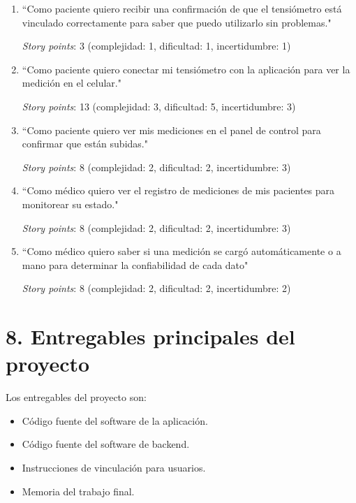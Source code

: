 \documentclass[
11pt, %
]{charter}
\begin{document}
\begin{enumerate}

\item ``Como paciente quiero recibir una confirmación de que el tensiómetro está vinculado correctamente para saber que puedo utilizarlo sin problemas."

\textit{Story points}: 3 (complejidad: 1, dificultad: 1, incertidumbre: 1)

\item ``Como paciente quiero conectar mi tensiómetro con la aplicación para ver la medición en el celular."

\textit{Story points}: 13 (complejidad: 3, dificultad: 5, incertidumbre: 3)

\item ``Como paciente quiero ver mis mediciones en el panel de control para confirmar que están subidas."

\textit{Story points}: 8 (complejidad: 2, dificultad: 2, incertidumbre: 3)

\item ``Como médico quiero ver el registro de mediciones de mis pacientes para monitorear su estado."

\textit{Story points}: 8 (complejidad: 2, dificultad: 2, incertidumbre: 3)

\item ``Como médico quiero saber si una medición se cargó automáticamente o a mano para determinar la confiabilidad de cada dato"

\textit{Story points}: 8 (complejidad: 2, dificultad: 2, incertidumbre: 2)

\end{enumerate}

\section{8. Entregables principales del proyecto}
\label{sec:entregables}

Los entregables del proyecto son:

\begin{itemize}
	\item Código fuente del software de la aplicación.
	\item Código fuente del software de backend.
	\item Instrucciones de vinculación para usuarios.
	\item Memoria del trabajo final.
\end{itemize}
\end{document}
